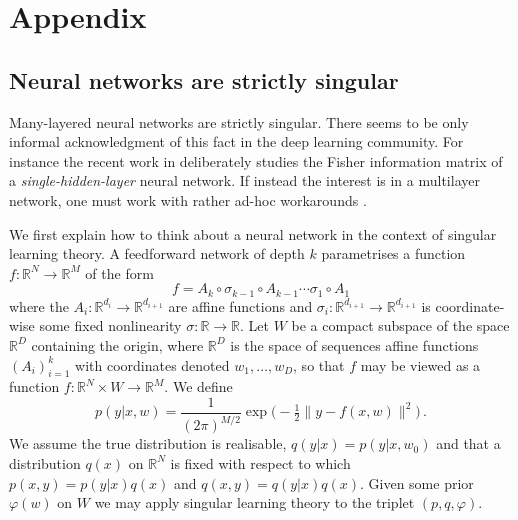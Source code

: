 \documentclass{article} %
\def\lto{\longrightarrow}
\begin{document}
%





\appendix
\section{Appendix}

\subsection{Neural networks are strictly singular}
\label{section:nn_singular}
Many-layered neural networks are strictly singular. There seems to be only informal acknowledgment of this fact in the deep learning community. For instance the recent work in \citet{pennington_spectrum_2018} deliberately studies the Fisher information matrix of a \textit{single-hidden-layer} neural network. If instead the interest is in a multilayer network, one must work with rather ad-hoc workarounds  \citep{sun2017relative}.  

We first explain how to think about a neural network in the context of singular learning theory. A feedforward network of depth $k$ parametrises a function $f: \mathbb{R}^N \lto \mathbb{R}^M$ of the form
\[
f = A_k \circ \sigma_{k-1} \circ A_{k-1} \cdots \sigma_1 \circ A_1
\]
where the $A_i: \mathbb{R}^{d_i} \lto \mathbb{R}^{d_{i+1}}$ are affine functions and $\sigma_i: \mathbb{R}^{d_{i+1}} \lto \mathbb{R}^{d_{i+1}}$ is coordinate-wise some fixed nonlinearity $\sigma: \mathbb{R} \lto \mathbb{R}$. Let $W$ be a compact subspace of the space $\mathbb{R}^D$ containing the origin, where $\mathbb{R}^D$ is the space of sequences affine functions $(A_i)_{i=1}^k$ with coordinates denoted $w_1,\ldots,w_D$, so that $f$ may be viewed as a function $f: \mathbb{R}^N \times W \lto \mathbb{R}^M$. We define
\begin{equation}
p(y|x,w) = \frac{1}{(2 \pi)^{M/2}} \exp\Big(-\tfrac{1}{2} \| y - f(x,w) \|^2 \Big)\,.
\label{eq:gaussian_model_in_w}
\end{equation}
We assume the true distribution is realisable, $q(y|x) = p(y|x,w_0)$ and that a distribution $q(x)$ on $\mathbb{R}^N$ is fixed with respect to which $p(x,y) = p(y|x)q(x)$ and $q(x,y) = q(y|x)q(x)$. Given some prior $\varphi(w)$ on $W$ we may apply singular learning theory to the triplet $(p,q,\varphi)$.
\end{document}
